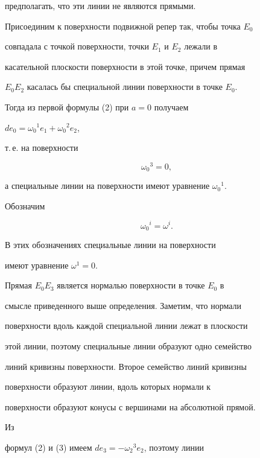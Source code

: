 предполагать, что эти линии не являются прямыми.





Присоединим к поверхности подвижной репер так, чтобы точка $E_0$


совпадала с точкой поверхности, точки $E_1$ и $E_2$ лежали в


касательной плоскости поверхности в этой точке, причем прямая


$E_0E_2$ касалась бы специальной линии поверхности в точке $E_0$.


Тогда из первой формулы (2) при $a=0$ получаем 


$de_0=\omega_0{}^1e_1+\omega_0{}^2e_2$,


т.\,е. на поверхности


\begin{equation}


\omega_0{}^3=0,


\end{equation}


а специальные линии на поверхности имеют уравнение $\omega_0{}^1$. 


Обозначим


\begin{equation}


\omega_0{}^i=\omega^i.


\end{equation}





В этих обозначениях специальные линии на поверхности


имеют уравнение $\omega^1=0$.





Прямая $E_0E_3$ является нормалью поверхности в точке $E_0$ в


смысле приведенного выше определения. Заметим, что нормали


поверхности вдоль каждой специальной линии лежат в плоскости


этой линии, поэтому специальные линии образуют одно семейство


линий кривизны поверхности. Второе семейство линий кривизны


поверхности образуют линии, вдоль которых нормали к


поверхности образуют конусы с вершинами на абсолютной прямой.


Из


формул (2) и (3) имеем $de_3=-\omega_2{}^3e_2$, поэтому линии



